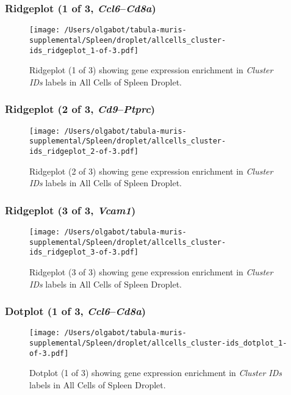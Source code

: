 \clearpage

\subsubsection{Ridgeplot (1 of 3, \emph{Ccl6}--\emph{Cd8a})}
\begin{figure}[h]
\centering
\texttt{[image: /Users/olgabot/tabula-muris-supplemental/Spleen/droplet/allcells\_cluster-ids\_ridgeplot\_1-of-3.pdf]}

\caption{ Ridgeplot (1 of 3)  showing gene expression enrichment in \emph{Cluster IDs} labels in All Cells of Spleen Droplet. }
\end{figure}


\clearpage

\subsubsection{Ridgeplot (2 of 3, \emph{Cd9}--\emph{Ptprc})}
\begin{figure}[h]
\centering
\texttt{[image: /Users/olgabot/tabula-muris-supplemental/Spleen/droplet/allcells\_cluster-ids\_ridgeplot\_2-of-3.pdf]}

\caption{ Ridgeplot (2 of 3)  showing gene expression enrichment in \emph{Cluster IDs} labels in All Cells of Spleen Droplet. }
\end{figure}


\clearpage

\subsubsection{Ridgeplot (3 of 3, \emph{Vcam1})}
\begin{figure}[h]
\centering
\texttt{[image: /Users/olgabot/tabula-muris-supplemental/Spleen/droplet/allcells\_cluster-ids\_ridgeplot\_3-of-3.pdf]}

\caption{ Ridgeplot (3 of 3)  showing gene expression enrichment in \emph{Cluster IDs} labels in All Cells of Spleen Droplet. }
\end{figure}


\clearpage

\subsubsection{Dotplot (1 of 3, \emph{Ccl6}--\emph{Cd8a})}
\begin{figure}[h]
\centering
\texttt{[image: /Users/olgabot/tabula-muris-supplemental/Spleen/droplet/allcells\_cluster-ids\_dotplot\_1-of-3.pdf]}

\caption{ Dotplot (1 of 3)  showing gene expression enrichment in \emph{Cluster IDs} labels in All Cells of Spleen Droplet. }
\end{figure}


